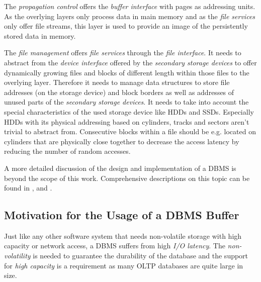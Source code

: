    The \emph{propagation control} offers the \emph{buffer interface} with pages as addressing units. As the overlying layers only process data in main memory and as the \emph{file services} only offer file streams, this layer is used to provide an image of the persistently stored data in memory. 

    The \emph{file management} offers \emph{file services} through the \emph{file interface}. It needs to abstract from the \emph{device interface} offered by the \emph{secondary storage devices} to offer dynamically growing files and blocks of different length within those files to the overlying layer. Therefore it needs to manage data structures to store file addresses (on the storage device) and block borders as well as addresses of unused parts of the \emph{secondary storage devices}. It needs to take into account the special characteristics of the used storage device like HDDs and SSDs. Especially HDDs with its physical addressing based on cylinders, tracks and sectors aren't trivial to abstract from. Consecutive blocks within a file should be e.g. located on cylinders that are physically close together to decrease the access latency by reducing the number of random accesses.

    A more detailed discussion of the design and implementation of a DBMS is beyond the scope of this work. Comprehensive descriptions on this topic can be found in \cite{Database_Systems_-_The_Complete_Book}, \cite{Datenbanksysteme_-_Konzepte_und_Techniken_der_Implementierung} and \cite{Datenbanken_-_Implementierungstechniken}.

\subsection[Motivation for a DBMS Buffer]{Motivation for the Usage of a DBMS Buffer} \label{subsec:motivationbuffer}

    Just like any other software system that needs non-volatile storage with high capacity or network access, a DBMS suffers from high \emph{I/O latency}. The \emph{non-volatility} is needed to guarantee the durability of the database and the support for \emph{high capacity} is a requirement as many OLTP databases are quite large in size. 

